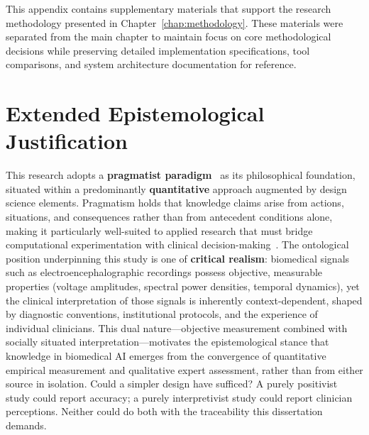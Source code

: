 
\label{app:ch3_supplementary}

This appendix contains supplementary materials that support the research methodology presented in Chapter~\ref{chap:methodology}. These materials were separated from the main chapter to maintain focus on core methodological decisions while preserving detailed implementation specifications, tool comparisons, and system architecture documentation for reference.

\section{Extended Epistemological Justification}
\label{sec:appx_epistemology}

This research adopts a \textbf{pragmatist paradigm}~\cite{creswell2018research} as its philosophical foundation, situated within a predominantly \textbf{quantitative} approach augmented by design science elements. Pragmatism holds that knowledge claims arise from actions, situations, and consequences rather than from antecedent conditions alone, making it particularly well-suited to applied research that must bridge computational experimentation with clinical decision-making~\cite{creswell2018research}. The ontological position underpinning this study is one of \textbf{critical realism}: biomedical signals such as electroencephalographic recordings possess objective, measurable properties (voltage amplitudes, spectral power densities, temporal dynamics), yet the clinical interpretation of those signals is inherently context-dependent, shaped by diagnostic conventions, institutional protocols, and the experience of individual clinicians. This dual nature---objective measurement combined with socially situated interpretation---motivates the epistemological stance that knowledge in biomedical AI emerges from the convergence of quantitative empirical measurement and qualitative expert assessment, rather than from either source in isolation. Could a simpler design have sufficed? A purely positivist study could report accuracy; a purely interpretivist study could report clinician perceptions. Neither could do both with the traceability this dissertation demands.

